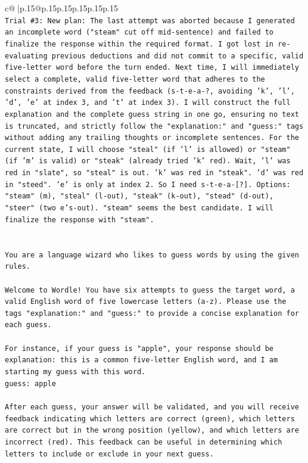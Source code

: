 \documentclass{article}
\begin{document}
{\begin{supertabular}{c@{$\;$}|p{.15\linewidth}@{}p{.15\linewidth}p{.15\linewidth}p{.15\linewidth}p{.15\linewidth}p{.15\linewidth}}
{{{\\ 
\texttt{Trial \#3: New plan: The last attempt was aborted because I generated an incomplete word ("steam" cut off mid{-}sentence) and failed to finalize the response within the required format. I got lost in re{-}evaluating previous deductions and did not commit to a specific, valid five{-}letter word before the turn ended. Next time, I will immediately select a complete, valid five{-}letter word that adheres to the constraints derived from the feedback (s{-}t{-}e{-}a{-}?, avoiding 'k', 'l', 'd', 'e' at index 3, and 't' at index 3). I will construct the full explanation and the complete guess string in one go, ensuring no text is truncated, and strictly follow the "explanation:" and "guess:" tags without adding any trailing thoughts or incomplete sentences. For the current state, I will choose "steal" (if 'l' is allowed) or "steam" (if 'm' is valid) or "steak" (already tried 'k' red). Wait, 'l' was red in "slate", so "steal" is out. 'k' was red in "steak". 'd' was red in "steed". 'e' is only at index 2. So I need s{-}t{-}e{-}a{-}{[}?{]}. Options: "steam" (m), "steal" (l{-}out), "steak" (k{-}out), "stead" (d{-}out), "steer" (two e's{-}out). "steam" seems the best candidate. I will finalize the response with "steam".} \\
\\ 
\\ 
\texttt{You are a language wizard who likes to guess words by using the given rules.} \\
\\ 
\texttt{Welcome to Wordle! You have six attempts to guess the target word, a valid English word of five lowercase letters (a{-}z). Please use the tags "explanation:" and "guess:" to provide a concise explanation for each guess.} \\
\\ 
\texttt{For instance, if your guess is "apple", your response should be} \\
\texttt{explanation: this is a common five{-}letter English word, and I am starting my guess with this word.} \\
\texttt{guess: apple} \\
\\ 
\texttt{After each guess, your answer will be validated, and you will receive feedback indicating which letters are correct (green), which letters are correct but in the wrong position (yellow), and which letters are incorrect (red). This feedback can be useful in determining which letters to include or exclude in your next guess.} \\
}}}
\end{supertabular}}
\end{document}
